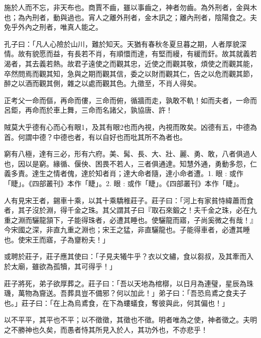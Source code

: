 \begin{pinyinscope}
施於人而不忘，非天布也。商賈不齒，雖以事齒之，神者勿齒。為外刑者，金與木也；為內刑者，動與過也。宵人之離外刑者，金木訊之；離內刑者，陰陽食之。夫免乎外內之刑者，唯真人能之。

孔子曰：「凡人心險於山川，難於知天。天猶有春秋冬夏旦暮之期，人者厚貌深情。故有貌愿而益，有長若不肖，有順懁而達，有堅而縵，有緩而釬。故其就義若渴者，其去義若熱。故君子遠使之而觀其忠，近使之而觀其敬，煩使之而觀其能，卒然問焉而觀其知，急與之期而觀其信，委之以財而觀其仁，告之以危而觀其節，醉之以酒而觀其側，雜之以處而觀其色。九徵至，不肖人得矣。

正考父一命而傴，再命而僂，三命而俯，循牆而走，孰敢不軌！如而夫者，一命而呂鉅，再命而於車上舞，三命而名諸父，孰協唐、許！

賊莫大乎德有心而心有眼1，及其有眼2也而內視，內視而敗矣。凶德有五，中德為首。何謂中德？中德也者，有以自好也而吡其所不為者也。

窮有八極，達有三必，形有六府。美、髯、長、大、壯、麗、勇、敢，八者俱過人也，因以是窮。緣循、偃佒、困畏不若人，三者俱通達。知慧外通，勇動多怨，仁義多責。達生之情者傀，達於知者肖；達大命者隨，達小命者遭。1. 眼 : 或作「睫」。《四部叢刊》本作「睫」。2. 眼 : 或作「睫」。《四部叢刊》本作「睫」。

人有見宋王者，錫車十乘，以其十乘驕稚莊子。莊子曰：「河上有家貧恃緯蕭而食者，其子沒於淵，得千金之珠。其父謂其子曰『取石來鍛之！夫千金之珠，必在九重之淵而驪龍頷下，子能得珠者，必遭其睡也。使驪龍而寤，子尚奚微之有哉！』今宋國之深，非直九重之淵也；宋王之猛，非直驪龍也。子能得車者，必遭其睡也。使宋王而寤，子為齏粉夫！」

或聘於莊子，莊子應其使曰：「子見夫犧牛乎？衣以文繡，食以芻叔，及其牽而入於太廟，雖欲為孤犢，其可得乎！」

莊子將死，弟子欲厚葬之。莊子曰：「吾以天地為棺槨，以日月為連璧，星辰為珠璣，萬物為齎送。吾葬具豈不備邪？何以加此！」弟子曰：「吾恐烏鳶之食夫子也。」莊子曰：「在上為烏鳶食，在下為螻蟻食，奪彼與此，何其偏也！」

以不平平，其平也不平；以不徵徵，其徵也不徵。明者唯為之使，神者徵之。夫明之不勝神也久矣，而愚者恃其所見入於人，其功外也，不亦悲乎！


\end{pinyinscope}